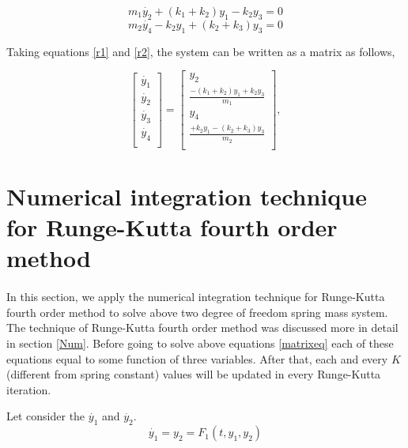 \begin{equation}
\label{r1}
    m_1\dot{y_2}+(k_1+k_2)y_1-k_2y_3=0
\end{equation}
\begin{equation}
\label{r2}
    m_2\dot{y_4}-k_2y_1+(k_2+k_3)y_3 = 0
\end{equation}

Taking equations \eqref{r1} and \eqref{r2}, the system can be written as a matrix as follows, 

\begin{equation}
\label{matrixeq}
        \left[ {\begin{array}{c}
         \dot{y_1}\\
         \dot{y_2}\\
         \dot{y_3}\\
        \dot{y_4}\\
         \end{array} } \right] =
         \left[ {\begin{array}{c}
       y_2 \\
         \frac{-(k_1+k_2)y_1+k_2y_3}{m_1}\\
       y_4\\
         \frac{+k_2y_1-(k_2+k_3)y_3 }{m_2}\\
         \end{array}} \right],
\end{equation}

\section{ Numerical integration technique for Runge-Kutta fourth order method}
\paragraph{}

In this section, we apply the numerical integration technique for Runge-Kutta fourth order method to solve above two degree of freedom spring mass system. The technique of Runge-Kutta fourth order method was discussed more in detail in section \ref{Num}. Before going to solve above equations \eqref{matrixeq} each of these equations equal to some function of three variables. After that, each and every $K$ (different from spring constant) values will be updated in every Runge-Kutta iteration.  

Let consider the $\dot{y_1}$ and $\dot{y_2}$. 
\begin{equation}
\label{y1}
    \dot{y_1} = y_2 = F_1(t,y_1,y_2)
\end{equation}

